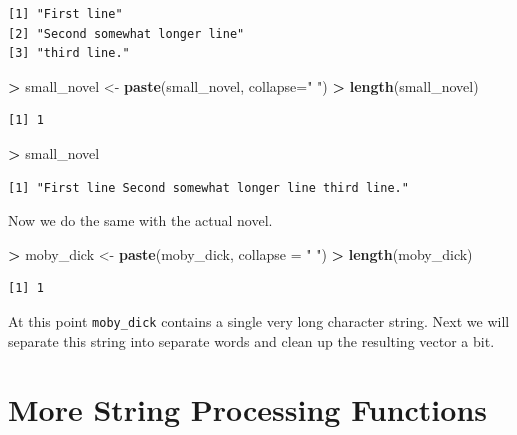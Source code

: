 \documentclass[
]{krantz}
\makeatletter
\newenvironment{Shaded}{\begin{snugshade}}{\end{snugshade}}
\newcommand{\DataTypeTok}[1]{\textcolor[rgb]{0.27,0.27,0.27}{#1}}
\newcommand{\KeywordTok}[1]{\textcolor[rgb]{0.27,0.27,0.27}{\textbf{#1}}}
\newcommand{\NormalTok}[1]{#1}
\newcommand{\OperatorTok}[1]{\textcolor[rgb]{0.43,0.43,0.43}{\textbf{#1}}}
\newcommand{\StringTok}[1]{\textcolor[rgb]{0.5,0.5,0.5}{#1}}
\newenvironment{kframe}{%
\medskip{}
\setlength{\fboxsep}{.8em}
 \def\at@end@of@kframe{}%
 \ifinner\ifhmode%
  \def\at@end@of@kframe{\end{minipage}}%
  \begin{minipage}{\columnwidth}%
 \fi\fi%
 \def\FrameCommand##1{\hskip\@totalleftmargin \hskip-\fboxsep
 \colorbox{shadecolor}{##1}\hskip-\fboxsep
     \hskip-\linewidth \hskip-\@totalleftmargin \hskip\columnwidth}%
 \MakeFramed {\advance\hsize-\width
   \@totalleftmargin\z@ \linewidth\hsize
   \@setminipage}}%
 {\par\unskip\endMakeFramed%
 \at@end@of@kframe}
\renewenvironment{Shaded}{\begin{kframe}}{\end{kframe}}
\makeatother
\begin{document}
\begin{verbatim}
[1] "First line"                 
[2] "Second somewhat longer line"
[3] "third line."                
\end{verbatim}

\begin{Shaded}
\begin{Highlighting}[]
\OperatorTok{\textgreater{}}\StringTok{ }\NormalTok{small\_novel \textless{}{-}}\StringTok{ }\KeywordTok{paste}\NormalTok{(small\_novel, }\DataTypeTok{collapse=}\StringTok{" "}\NormalTok{)}
\OperatorTok{\textgreater{}}\StringTok{ }\KeywordTok{length}\NormalTok{(small\_novel)}
\end{Highlighting}
\end{Shaded}

\begin{verbatim}
[1] 1
\end{verbatim}

\begin{Shaded}
\begin{Highlighting}[]
\OperatorTok{\textgreater{}}\StringTok{ }\NormalTok{small\_novel}
\end{Highlighting}
\end{Shaded}

\begin{verbatim}
[1] "First line Second somewhat longer line third line."
\end{verbatim}

Now we do the same with the actual novel.

\begin{Shaded}
\begin{Highlighting}[]
\OperatorTok{\textgreater{}}\StringTok{ }\NormalTok{moby\_dick \textless{}{-}}\StringTok{ }\KeywordTok{paste}\NormalTok{(moby\_dick, }\DataTypeTok{collapse =} \StringTok{" "}\NormalTok{)}
\OperatorTok{\textgreater{}}\StringTok{ }\KeywordTok{length}\NormalTok{(moby\_dick)}
\end{Highlighting}
\end{Shaded}

\begin{verbatim}
[1] 1
\end{verbatim}

At this point \texttt{moby\_dick} contains a single very long character string. Next we will separate this string into separate words and clean up the resulting vector a bit.

\hypertarget{more-string-processing-functions}{%
\section{More String Processing Functions}\label{more-string-processing-functions}}
\end{document}
